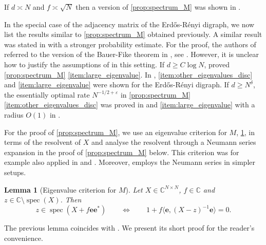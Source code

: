 \documentclass[11pt]{article}
\DeclareMathOperator{\spec}{spec}
\newcommand{\C}{\mathbb{C}}
\newcommand{\eps}{\varepsilon}
\theoremstyle{plain}
\newtheorem{lemma}{Lemma}[section]
\theoremstyle{remark}
\numberwithin{equation}{section}
\newcommand{\nc}{\normalcolor}
\begin{document}
If $d \asymp N$ and $f \asymp \sqrt{N}$ then a version of \cref{prop:spectrum_M} was shown in  \cite[Theorem~1.9]{zbMATH06141055}. 

In the special case of the adjacency matrix of the Erd{\H o}s-R\'enyi digraph, we now list the 
results similar to \cref{prop:spectrum_M} obtained previously.  
A similar result 
was stated in \cite[Corollary~3.5]{BBK_spec_radii} with a stronger probability estimate. 
For the proof, the authors of \cite{BBK_spec_radii} referred to the version of the Bauer-Fike theorem in 
\cite{BLL2018Nonbacktracking}, see  \cite[Proposition~7]{BLL2018Nonbacktracking}. 
However, it is unclear how to justify the assumptions of \cite[Proposition~7]{BLL2018Nonbacktracking} in this setting. 
If $d \geq C \log N$, \cite[Corollary~1]{MR4206685} proved \cref{prop:spectrum_M} \cref{item:large_eigenvalue}. In \cite[Theorem~4.3]{MR4649432}, \cref{item:other_eigenvalues_disc} and \cref{item:large_eigenvalue} were shown for the Erd{\H o}s-R\'enyi digraph. 
If $d \geq N^\delta$, the essentially optimal rate $N^{-1/2+\eps}$ in \cref{prop:spectrum_M} \cref{item:other_eigenvalues_disc}
was proved in \cite[Theorem~1.2(i)]{HeDigraph} and \cref{item:large_eigenvalue} 
with a radius $O(1)$ in \cite[Lemma~4.5]{HeDigraph}.  

For the proof of \cref{prop:spectrum_M}, we use an eigenvalue criterion for $M$, 
\cref{lem:eigenvalue_criterion}, in terms of the resolvent of $X$ and analyse the resolvent through a Neumann series expansion in the proof of \cref{prop:spectrum_M} below. 
 This criterion was for example also applied \nc in \cite[Section~4.1]{BGN11} and \cite[ Sections~2, 3 and 5]{zbMATH06141055}. Moreover, \cite{zbMATH06141055} employs the Neumann series in simpler setups. 


\begin{lemma}[Eigenvalue criterion for $M$] \label{lem:eigenvalue_criterion}
Let $X \in \C^{N\times N}$,  $f \in \C$ and $z \in \C \setminus \spec(X)$. Then 
\[ z \in \spec ( X + f \mathbf e \mathbf e^*) \qquad \iff \qquad 1 + f\langle \mathbf e, (X-z)^{-1} \mathbf e \rangle =0. 
\] 
\end{lemma} 

 The previous lemma coincides with \cite[Lemma 2.1]{zbMATH06141055}.
We present its short proof for the reader's convenience.
\end{document}
